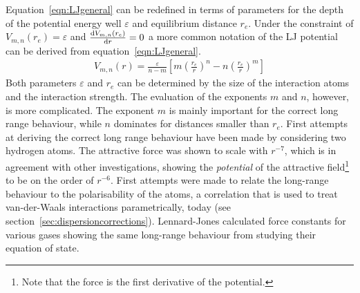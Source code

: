 Equation~\ref{eqn:LJgeneral} can be redefined in terms of parameters for the
depth of the potential energy well $\varepsilon$ and equilibrium distance
$r_e$. Under the constraint of $V_{m,n}(r_e)=\varepsilon$ and
$\dv{V_{m,n}(r_e)}{r}=0$ a more common notation of the \ac{LJ} potential can be
derived from equation~\ref{eqn:LJgeneral}.
%
\begin{align}
    V_{m,n}(r)=\frac{\varepsilon}{n-m} \left[ m \left(\frac{r_e}{r}\right)^n  - n\left(\frac{r_e}{r}\right)^m \right]
\end{align}
%
Both parameters $\varepsilon$ and $r_e$ can be determined by the size of the
interaction atoms and the interaction strength. The evaluation of the exponents
$m$ and $n$, however, is more complicated. The exponent $m$ is mainly important
for the correct long range behaviour, while $n$ dominates for distances smaller
than $r_e$. First attempts at deriving the correct long range behaviour have been
made by considering two hydrogen
atoms.\autocite{Wang_gegenseitigeEinwirkungzweier_1927} The attractive force
was shown to scale with $r^{-7}$, which is in agreement with other
investigations, showing the \textit{potential} of the attractive
field\footnote{Note that the force is the first derivative of the potential.}
to be on the order of
$r^{-6}$.\autocite{Eisenschitz_UeberVerhaeltnisvan_1930,Lennard-Jones_Perturbationproblemsquantum_1930,Hasse_calculationvanWaal_1931,Slater_VanWaalsForces_1931}
First attempts were made to relate the long-range behaviour to the
polarisability of the
atoms,\autocite{London_ZurTheorieund_1930,Slater_VanWaalsForces_1931} a
correlation that is used to treat van-der-Waals interactions parametrically,
today (see section~\ref{sec:dispersioncorrections}). Lennard-Jones calculated
force constants for various gases showing the same long-range behaviour from
studying their equation of
state.\autocite{Jones_DeterminationMolecularFields_1924,Jones_atomicfieldshelium_1925,Lennard-Jones_theoreticalcalculationsphysical_1925,Lennard-Jones_molecularfieldshydrogen_1926,Lennard-Jones_equationstategaseous_1927}

